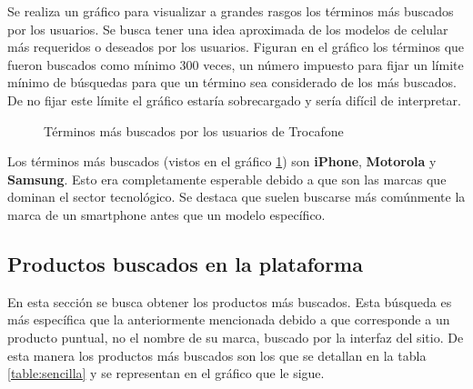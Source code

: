 \documentclass[a4paper]{article}
\begin{document}
Se realiza un gráfico para visualizar a grandes rasgos los términos más buscados por los usuarios. Se busca tener una idea aproximada de los modelos de celular más requeridos o deseados por los usuarios. Figuran en el gráfico los términos que fueron buscados como mínimo 300 veces, un número impuesto para fijar un límite mínimo de búsquedas para que un término sea considerado de los más buscados. De no fijar este límite el gráfico estaría sobrecargado y sería difícil de interpretar.

\begin{figure}[h!]
	\caption{Términos más buscados por los usuarios de Trocafone}
	\label{fig:searchedterm}
\end{figure}

Los términos más buscados (vistos en el gráfico \ref{fig:searchedterm}) son \textbf{iPhone}, \textbf{Motorola} y \textbf{Samsung}. Esto era completamente esperable debido a que son las marcas que dominan el sector tecnológico. Se destaca que suelen buscarse más comúnmente la marca de un smartphone antes que un modelo específico.

\subsection{Productos buscados en la plataforma}

En esta sección se busca obtener los productos más buscados. Esta búsqueda es más específica que la anteriormente mencionada debido a que corresponde a un producto puntual, no el nombre de su marca, buscado por la interfaz del sitio. De esta manera los productos más buscados son los que se detallan en la tabla \ref{table:sencilla} y se representan en el gráfico que le sigue.
\end{document}
